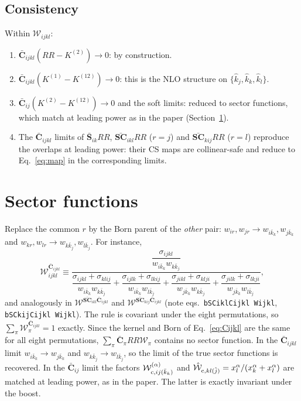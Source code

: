 \documentclass[11pt,a4paper]{article}
\newcommand{\bbC}[1]{\bar{\mathbf C}_{#1}}
\newcommand{\bbS}[1]{\bar{\mathbf S}_{#1}}
\newcommand{\bbSC}[1]{\bar{\mathbf{SC}}_{#1}}
\newcommand{\RR}{RR}
\newcommand{\W}[1]{\mathcal W_{#1}}
\newcommand{\jb}{\bar k_{j}}
\newcommand{\kb}{\bar k_{k}}
\newcommand{\jh}{\hat k_{j}}
\newcommand{\kh}{\hat k_{k}}
\newcommand{\lh}{\hat k_{l}}
\begin{document}
\subsection{Consistency}
Within $\W{ijkl}$:
\begin{enumerate}
\item $\bbC{ijkl}(\RR-K^{(2)})\to0$: by construction.
\item $\bbC{ijkl}(K^{(1)}-K^{(12)})\to0$: this is the NLO structure on $\{\jh,\kh,\lh\}$.
\item $\bbC{ij}(K^{(2)}-K^{(12)})\to0$ and the soft limits: reduced to sector functions,
which match at leading power as in the paper (Section~\ref{sec:sectors}).
\item The $\bbC{ijkl}$ limits of $\bbS{ik}\RR$, $\bbSC{ikl}\RR$ ($r=j$) and $\bbSC{kij}\RR$ ($r=l$)
reproduce the overlaps at leading power: their CS maps are collinear-safe and reduce to
Eq.~\eqref{eq:map} in the corresponding limits.
\end{enumerate}

\section{Sector functions}
\label{sec:sectors}
Replace the common $r$ by the Born parent of the \emph{other} pair:
$w_{ir},w_{jr}\to w_{i\kb},w_{j\kb}$ and $w_{kr},w_{lr}\to w_{k\jb},w_{l\jb}$.
For instance,
\begin{equation}
\W{ijkl}^{\bbC{ijkl}}
\equiv
\frac{\dfrac{\sigma_{ijkl}}{w_{i\kb}w_{k\jb}}}
{\dfrac{\sigma_{ijkl}+\sigma_{klij}}{w_{i\kb}w_{k\jb}}
+\dfrac{\sigma_{ijlk}+\sigma_{lkij}}{w_{i\kb}w_{l\jb}}
+\dfrac{\sigma_{jikl}+\sigma_{klji}}{w_{j\kb}w_{k\jb}}
+\dfrac{\sigma_{jilk}+\sigma_{lkji}}{w_{j\kb}w_{l\jb}}},
\end{equation}
and analogously in $\W{}^{\bbSC{ikl}\bbC{ijkl}}$ and $\W{}^{\bbSC{kij}\bbC{ijkl}}$ (note eqs.~\texttt{bSCiklCijkl Wijkl},
\texttt{bSCkijCijkl Wijkl}). The rule is covariant under the eight permutations, so
$\sum_\pi\W{\pi}^{\bbC{ijkl}}=1$ exactly. Since the kernel and Born of Eq.~\eqref{eq:Cijkl} are the
same for all eight permutations, $\sum_\pi\bbC{\pi}\RR\W{\pi}$ contains no sector function.
In the $\bbC{ijkl}$ limit $w_{i\kb}\to w_{j\kb}$ and $w_{k\jb}\to w_{l\jb}$, so the limit of the true
sector functions is recovered. In the $\bbC{ij}$ limit the factors $\W{{\rm c},ij(\kb)}^{(\alpha)}$ and
$\hat{\mathcal W}_{{\rm c},kl(\hat j)}=x_l^\alpha/(x_k^\alpha+x_l^\alpha)$ are matched at leading power,
as in the paper. The latter is exactly invariant under the boost.
\end{document}
